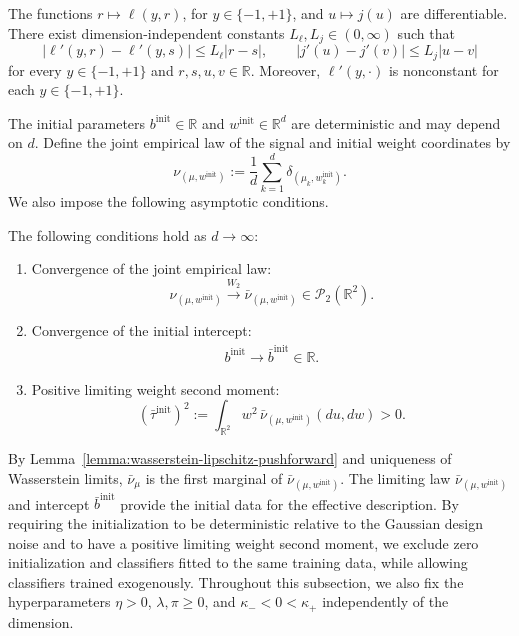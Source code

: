 \begin{assumption}
\label{assumption:regularity-of-loss-and-penalty}
The functions $r\mapsto\ell(y,r)$, for $y\in\{-1,+1\}$,
and $u\mapsto j(u)$ are differentiable.
There exist dimension-independent constants
$L_\ell,L_j\in(0,\infty)$ such that
\[
    |\ell'(y,r)-\ell'(y,s)|
    \leq L_\ell|r-s|,
    \qquad
    |j'(u)-j'(v)|
    \leq L_j|u-v|
\]
for every $y\in\{-1,+1\}$ and $r,s,u,v\in\mathbb R$.
Moreover, $\ell'(y,\cdot)$ is nonconstant for each
$y\in\{-1,+1\}$.
\end{assumption}
The initial parameters $b^{\mathrm{init}}\in\mathbb R$ and
$w^{\mathrm{init}}\in\mathbb R^d$ are deterministic and may
depend on $d$. Define the joint empirical law of the signal
and initial weight coordinates by
\[
    \nu_{(\mu,w^{\mathrm{init}})}
    :=
    \frac1d\sum_{k=1}^d
        \delta_{(\mu_k,w_k^{\mathrm{init}})}.
\]
We also impose the following asymptotic conditions.

\begin{assumption}
\label{assumption:quenched-initialization}
The following conditions hold as $d\to\infty$:
\begin{enumerate}
    \item Convergence of the joint empirical law:
    \begin{equation}
        \nu_{(\mu,w^{\mathrm{init}})}
        \xrightarrow{W_2}
        \bar\nu_{(\mu,w^{\mathrm{init}})}
        \in\mathscr P_2(\mathbb R^2).
        \label{eq:backward-init}
    \end{equation}

    \item Convergence of the initial intercept:
    \begin{align}
        b^{\mathrm{init}}
        \longrightarrow
        \bar b^{\mathrm{init}}\in\mathbb R.
    \end{align}

    \item Positive limiting weight second moment:
    \begin{equation}
        (\bar\tau^{\mathrm{init}})^2
        :=
        \int_{\mathbb R^2}w^2\,
        \bar\nu_{(\mu,w^{\mathrm{init}})}(du,dw)
        >0.
        \label{eq:positive-init-mean-field-weight-norm}
    \end{equation}
\end{enumerate}
\end{assumption}
By Lemma~\ref{lemma:wasserstein-lipschitz-pushforward}
and uniqueness of Wasserstein limits, $\bar\nu_\mu$ is the
first marginal of $\bar\nu_{(\mu,w^{\mathrm{init}})}$.
The limiting law $\bar\nu_{(\mu,w^{\mathrm{init}})}$ and intercept
$\bar b^{\mathrm{init}}$ provide the initial data for the effective
description. By requiring the initialization to be deterministic
relative to the Gaussian design noise and to have a positive
limiting weight second moment, we exclude zero initialization
and classifiers fitted to the same training data, while allowing
classifiers trained exogenously. Throughout this subsection,
we also fix the hyperparameters $\eta>0$, $\lambda,\pi\geq0$,
and $\kappa_-<0<\kappa_+$ independently of the dimension.

